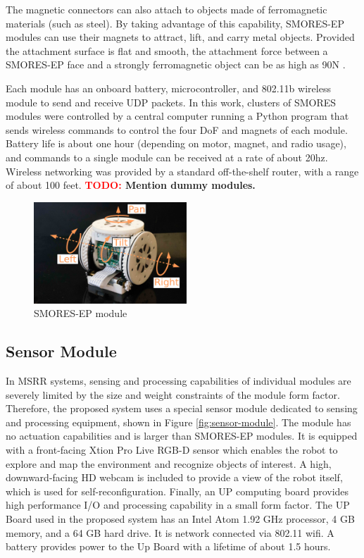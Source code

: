 \documentclass[conference]{IEEEtran}
\newcommand{\TODO}[1]{ {\bf \textcolor{red}{TODO:} #1 }}
\begin{document}
The magnetic connectors can also attach to objects made of ferromagnetic
materials (such as steel).  By taking advantage of this capability, SMORES-EP
modules can use their magnets to attract, lift, and carry metal objects.
Provided the attachment surface is flat and smooth, the attachment force
between a SMORES-EP face and a strongly ferromagnetic object can be as high as
90N \cite{tosun2016design}.

Each module has an onboard battery, microcontroller, and 802.11b wireless
module to send and receive UDP packets.  In this work, clusters of SMORES
modules were controlled by a central computer running a Python program that
sends wireless commands to control the four DoF and magnets of each module.
Battery life is about one hour (depending on motor, magnet, and radio usage),
and commands to a single module can be received at a rate of about 20hz.
Wireless networking was provided by a standard off-the-shelf  router, with a
range of about 100 feet.
\TODO{Mention dummy modules.}
\begin{figure}   
\begin{center}
\includegraphics[height=1.5in]{images/smores_dof.pdf}
\end{center}
\caption{SMORES-EP module}
\label{fig:smores-module}
\end{figure}
%

\subsection{Sensor Module} %
\label{sec:sensor_module}
%

In MSRR systems, sensing and processing capabilities of individual modules are severely limited by the size and weight constraints of the module form factor. Therefore, the proposed system uses a special sensor module dedicated to sensing and processing equipment, shown in Figure \ref{fig:sensor-module}. The module has no actuation capabilities and is larger than SMORES-EP modules. It is equipped with a front-facing Xtion Pro Live RGB-D sensor which enables the robot to explore and map the environment and recognize objects of interest. A high, downward-facing HD webcam is included to provide a view of the robot itself, which is used for self-reconfiguration. Finally, an UP computing board provides high performance I/O and processing capability in a small form factor. The UP Board used in the proposed system has an Intel Atom 1.92 GHz processor, 4 GB memory, and a 64 GB hard drive. It is network connected via 802.11 wifi. A battery provides power to the Up Board with a lifetime of about 1.5 hours.
\end{document}
